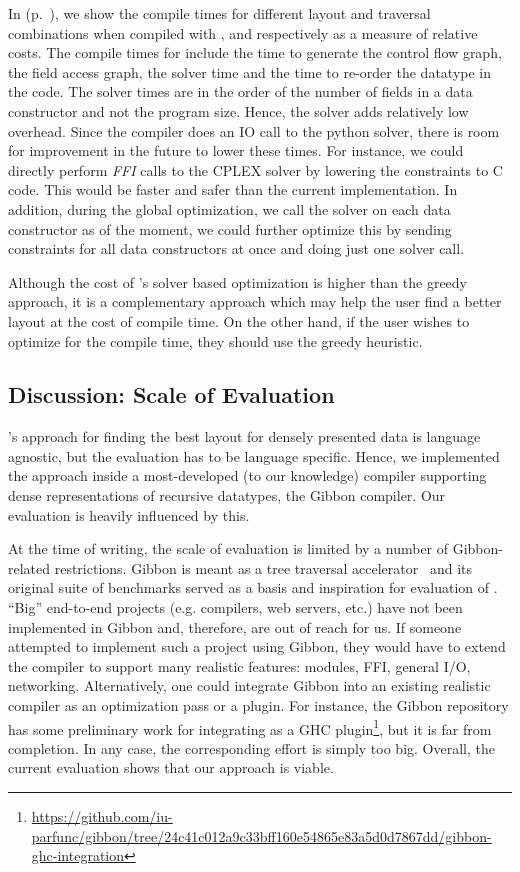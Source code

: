 In  (p.~\pageref{table:compiletimes}), we show the compile times for different layout and traversal combinations when compiled with \gibbon, \systemGreedy and \systemSolver respectively as
a measure of relative costs. The compile times for \systemSolver include the time to generate the control flow graph, the field access graph, the solver time and the time to re-order the datatype in the code.
The solver times are in the order of the number of fields in a data constructor and not the program size. Hence, the solver adds relatively low overhead.
Since the compiler does an IO call to the python solver, there is room for improvement in the future to lower these times. 
For instance, we could directly perform \textit{FFI} calls to the CPLEX solver by lowering the constraints to C code. 
This would be faster and safer than the current implementation. In addition, during the global optimization, we call the solver on each data constructor as of the moment, 
we could further optimize this by sending constraints for all data constructors at once and doing just one solver call. 

Although the cost of \system's solver based optimization is higher than the greedy approach, it is a complementary approach 
which may help the user find a better layout at the cost of compile time. On the other hand, if the user wishes to optimize 
for the compile time, they should use the greedy heuristic.


\subsection{Discussion: Scale of Evaluation}%
\label{subsec:scale-eval}

\system's approach for finding the best layout for densely presented
data is language agnostic, but the evaluation has to be language specific.
Hence, we implemented the approach inside a most-developed (to our
knowledge) compiler supporting dense representations of recursive datatypes, the
Gibbon compiler. Our evaluation is heavily influenced by this.

At the time of writing, the scale of evaluation is limited by a number of
Gibbon-related restrictions.
Gibbon is meant as a tree traversal accelerator~\cite{gibbon} and
its original suite of benchmarks served as a basis and inspiration for
evaluation of \system.
``Big'' end-to-end projects (e.g. compilers, web servers, etc.)
have not been implemented in Gibbon and, therefore, are out of reach for us.
If someone attempted to implement such a project using Gibbon,
they would have to extend the compiler to support many realistic features:
modules, FFI, general I/O, networking.
Alternatively, one could integrate Gibbon into an existing realistic compiler
as an optimization pass or a plugin.
For instance, the Gibbon repository has some preliminary work for integrating as a
GHC plugin\footnote{%
  \url{https://github.com/iu-parfunc/gibbon/tree/24c41c012a9c33bff160e54865e83a5d0d7867dd/gibbon-ghc-integration}
}, but it is far from completion.
In any case, the corresponding effort is simply too big.
%
Overall, the current \system evaluation shows that our approach is viable.
